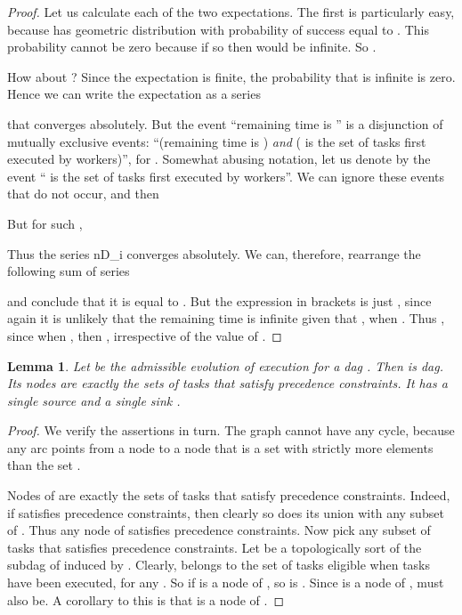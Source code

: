 \documentclass[letterpaper,11pt]{article}
\newtheorem{lemma}[theorem]{Lemma}
\begin{document}
{\begin{proof}
Let us calculate each of the two expectations. The first is particularly easy, because  has geometric distribution with probability of success equal to . This probability cannot be zero because if so then  would be infinite. So .


How about ? Since the expectation is finite, the probability that  is infinite is zero. Hence we can write the expectation as a series

that converges absolutely.
But the event ``remaining time is '' is a disjunction of  mutually exclusive events: ``(remaining time is ) {\em and} ( is the set of tasks first executed by workers)'', for . Somewhat abusing notation, let us denote by  the event `` is the set of tasks first executed by workers''. We can ignore these events that do not occur, and then 

But for such , 

Thus the series
nD_i converges absolutely. We can, therefore, rearrange the following sum of series

and conclude that it is equal to .
But the expression in brackets is just , since again it is unlikely that the remaining time is infinite given that , when . Thus , since when , then , irrespective of the value of .
\end{proof}


\renewcommand{\thetheorem}{3.2}

\begin{lemma}
Let  be the admissible evolution of execution for a dag . Then  is dag. Its nodes are exactly the sets of tasks that satisfy precedence constraints. It has a single source  and a single sink .
\end{lemma}

\begin{proof}
We verify the assertions in turn.
The graph  cannot have any cycle, because any arc points from a node  to a node  that is a set with strictly more elements than the set .

Nodes of  are exactly the sets of tasks that satisfy precedence constraints. Indeed, if  satisfies precedence constraints, then clearly so does its union with any subset of . Thus any node of  satisfies precedence constraints. Now pick any subset  of tasks that satisfies precedence constraints. Let  be a topologically sort of the subdag of  induced by . Clearly,  belongs to the set of tasks eligible when tasks  have been executed, for any . So if  is a node of , so is . Since  is a node of ,  must also be. A corollary to this is that  is a node of .


\end{proof}}
\end{document}
